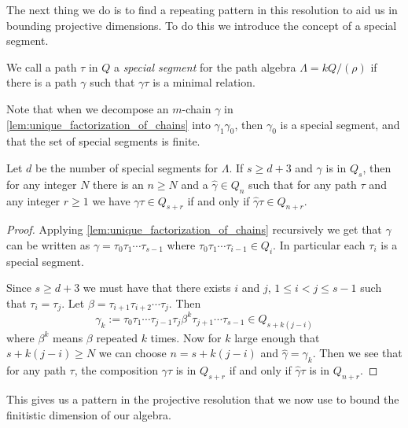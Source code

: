 The next thing we do is to find a repeating pattern in this resolution to aid us in bounding projective dimensions. To do this we introduce the concept of a special segment.

\begin{defn}
	We call a path $\tau$ in $Q$ a \emph{special segment} for the path algebra $\Lambda = kQ/(\rho)$ if there is a path $\gamma$ such that $\gamma\tau$ is a minimal relation.
\end{defn}

Note that when we decompose an $m$-chain $\gamma$ in \cref{lem:unique_factorization_of_chains} into $\gamma_1\gamma_0$, then $\gamma_0$ is a special segment, and that the set of special segments is finite.

\begin{lemma}\cite[Theorem~2.2]{GKK91}\label{lem:monomial_relation_repetition}
	Let $d$ be the number of special segments for $\Lambda$. If $s \geq d+3$ and $\gamma$ is in $Q_s$, then for any integer $N$ there is an $n \geq N$ and a $\hat{\gamma} \in Q_n$ such that for any path $\tau$ and any integer $r \geq 1$ we have $\gamma\tau \in Q_{s+r}$ if and only if $\hat{\gamma}\tau \in Q_{n+r}$.
	\begin{proof}
		Applying \cref{lem:unique_factorization_of_chains} recursively we get that $\gamma$ can be written as $\gamma = \tau_0\tau_1\cdots \tau_{s-1}$ where $\tau_0\tau_1 \cdots \tau_{i-1} \in Q_i$. In particular each $\tau_i$ is a special segment.
		
		Since $s \geq d+3$ we must have that there exists $i$ and $j$, $1\leq i < j \leq s-1$ such that $\tau_i=\tau_j$. Let $\beta = \tau_{i+1}\tau_{i+2}\cdots\tau_j$. Then $$\gamma_k := \tau_0\tau_1\cdots\tau_{j-1}\tau_j\beta^k\tau_{j+1}\cdots\tau_{s-1} \in Q_{s + k(j-i)}$$
		where $\beta^k$ means $\beta$ repeated $k$ times. Now for $k$ large enough that $s+k(j-i) \geq N$ we can choose $n=s+k(j-i)$ and $\hat{\gamma}=\gamma_k$. Then we see that for any path $\tau$, the composition $\gamma\tau$ is in $Q_{s+r}$ if and only if $\hat{\gamma}\tau$ is in $Q_{n+r}$.
	\end{proof}
\end{lemma}

This gives us a pattern in the projective resolution that we now use to bound the finitistic dimension of our algebra.

